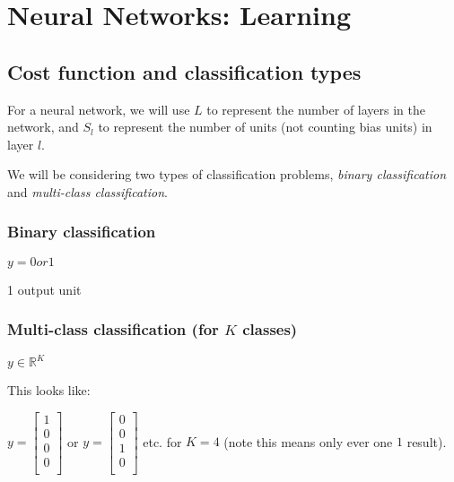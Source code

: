 
\chapter{Neural Networks: Learning}
\section{Cost function and classification types}

For a neural network, we will use $L$ to represent the number of layers in the network, and $S_l$ to represent the number of units (not counting bias units) in layer $l$. 

We will be considering two types of classification problems, \emph{binary classification} and \emph{multi-class classification}.

\subsection{Binary classification}

$y = 0 or 1$

1 output unit

\subsection{Multi-class classification (for $K$ classes)}

$y \in \mathds{R}^K$

This looks like:

$y =
\begin{bmatrix}
      1 \\
      0 \\
      0 \\
      0 \\
\end{bmatrix}$
or
$y =
\begin{bmatrix}
      0 \\
      0 \\
      1 \\
      0 \\
\end{bmatrix}$
etc. for $K = 4$ (note this means only ever one $1$ result).

